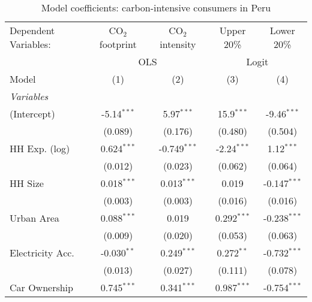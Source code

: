 
\begin{table}[htbp!]
   \centering
   \small
   \begin{adjustbox}{width = 1\textwidth, max height = 0.95\textheight, center}
      \begin{threeparttable}[b]
         \caption{\label{tab:Logit_1_PER} Model coefficients: carbon-intensive consumers in Peru}
         \begin{tabular}{lcccc}
            \tabularnewline \midrule \midrule
            Dependent Variables: & CO$_{2}$ footprint & CO$_{2}$ intensity & Upper 20\%    & Lower 20\%\\   
             & \multicolumn{2}{c}{OLS} & \multicolumn{2}{c}{Logit} \\ 
            Model                & (1)                & (2)                & (3)           & (4)\\  
            \midrule
            \emph{Variables}\\
            (Intercept)          & -5.14$^{***}$      & 5.97$^{***}$       & 15.9$^{***}$  & -9.46$^{***}$\\   
                                 & (0.089)            & (0.176)            & (0.480)       & (0.504)\\   
            HH Exp. (log)        & 0.624$^{***}$      & -0.749$^{***}$     & -2.24$^{***}$ & 1.12$^{***}$\\   
                                 & (0.012)            & (0.023)            & (0.062)       & (0.064)\\   
            HH Size              & 0.018$^{***}$      & 0.013$^{***}$      & 0.019         & -0.147$^{***}$\\   
                                 & (0.003)            & (0.003)            & (0.016)       & (0.016)\\   
            Urban Area           & 0.088$^{***}$      & 0.019              & 0.292$^{***}$ & -0.238$^{***}$\\   
                                 & (0.009)            & (0.020)            & (0.053)       & (0.063)\\   
            Electricity Acc.     & -0.030$^{**}$      & 0.249$^{***}$      & 0.272$^{**}$  & -0.732$^{***}$\\   
                                 & (0.013)            & (0.027)            & (0.111)       & (0.078)\\   
            Car Ownership        & 0.745$^{***}$      & 0.341$^{***}$      & 0.987$^{***}$ & -0.754$^{***}$\\   

\end{tabular}
\end{threeparttable}
\end{adjustbox}
\end{table}

